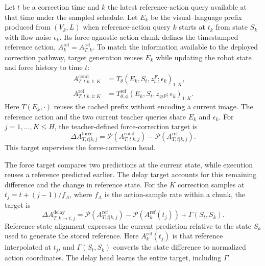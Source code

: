 Let $t$ be a correction time and $k$ the latest reference-action query available at that time under the sampled schedule. Let $E_k$ be the visual--language prefix produced from $(V_k,L)$ when reference-action query $k$ starts at $t_k$ from state $S_k$ with flow noise $\epsilon_k$. Its force-agnostic action chunk defines the timestamped reference action, $A_k^{\mathrm{ref}}=A_{T,k}^{\mathrm{ref}}$. To match the information available to the deployed correction pathway, target generation reuses $E_k$ while updating the robot state and force history to time $t$:
\begin{align}
    A_{T,t|k,1:K}^{\mathrm{cond}}
    &=T_\theta(E_k,S_t,z_t^F;\epsilon_k)_{1:K},
    \label{eq:cached_conditioned_teacher}\\
    A_{T,t|k,1:K}^{\mathrm{ref}}
    &=T_{\theta,\phi}^{\mathrm{ref}}
      (E_k,S_t,z_{\varnothing F};\epsilon_k)_{1:K}.
    \label{eq:cached_missing_teacher}
\end{align}
Here $T(E_k,\cdot)$ reuses the cached prefix without encoding a current image. The reference action and the two current teacher queries share $E_k$ and $\epsilon_k$. For $j=1,\ldots,K\leq H$, the teacher-defined force-correction target is
\begin{equation}
    \Delta A_{T,t|k,j}^{\mathrm{force}}
    =\mathcal P\!\left(A_{T,t|k,j}^{\mathrm{cond}}\right)
     -\mathcal P\!\left(A_{T,t|k,j}^{\mathrm{ref}}\right).
    \label{eq:force_target}
\end{equation}
This target supervises the force-correction head.

The force target compares two predictions at the current state, while execution reuses a reference predicted earlier. The delay target accounts for this remaining difference and the change in reference state. For the $K$ correction samples at $t_j=t+(j-1)/f_A$, where $f_A$ is the action-sample rate within a chunk, the target is
\begin{equation}
    \Delta A_{T,k\rightarrow t,j}^{\mathrm{delay}}
    =\mathcal P\!\left(A_{T,t|k,j}^{\mathrm{ref}}\right)
      -\mathcal P\!\left(A_k^{\mathrm{ref}}(t_j)\right)
      +\Gamma(S_t,S_k).
    \label{eq:delay_target}
\end{equation}
Reference-state alignment expresses the current prediction relative to the state $S_k$ used to generate the stored reference. Here $A_k^{\mathrm{ref}}(t_j)$ is that reference interpolated at $t_j$, and $\Gamma(S_t,S_k)$ converts the state difference to normalized action coordinates. The delay head learns the entire target, including $\Gamma$.

